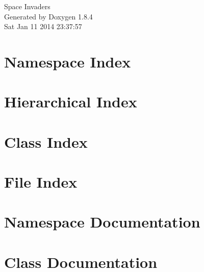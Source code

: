 \documentclass[twoside]{book}
\newcommand{\clearemptydoublepage}{%
  \newpage{\pagestyle{empty}\cleardoublepage}%
}
\begin{document}
\begin{titlepage}
\vspace*{7cm}
\begin{center}%
{\Large Space Invaders }\\
\vspace*{1cm}
{\large Generated by Doxygen 1.8.4}\\
\vspace*{0.5cm}
{\small Sat Jan 11 2014 23:37:57}\\
\end{center}
\end{titlepage}
\clearemptydoublepage
\tableofcontents
\clearemptydoublepage
{}

\chapter{Namespace Index}

\chapter{Hierarchical Index}

\chapter{Class Index}

\chapter{File Index}

\chapter{Namespace Documentation}


\chapter{Class Documentation}





























\end{document}
